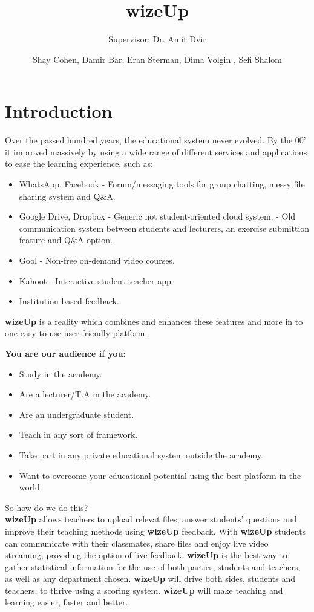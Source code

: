 \documentclass{article}
\title{wizeUp}
\author{Supervisor: Dr. Amit Dvir}
\author{Shay Cohen, Damir Bar, Eran Sterman, Dima Volgin , Sefi Shalom}
\begin{document}
\maketitle

\section{Introduction}

Over the passed hundred years, the educational system never evolved. By the 00' it improved massively by using a wide range of different services and applications to ease the learning experience, such as: 
\begin{itemize}
\item WhatsApp, Facebook - Forum/messaging tools for group chatting, messy file sharing system and Q&A.
\item Google Drive, Dropbox - Generic not student-oriented cloud system.
\itemMoodle - Old communication system between students and lecturers, an exercise submittion feature and Q&A option.
\item Gool - Non-free on-demand video courses.
\item Kahoot - Interactive student teacher app.
\item Institution based feedback.
\end{itemize}
\textbf{wizeUp}  is a reality which combines and enhances these features and more in to one easy-to-use user-friendly platform.

\textbf{You are our audience if you}:
\begin{itemize}
\item Study in the academy.
\item Are a lecturer/T.A in the academy.
\item Are an undergraduate student.
\item Teach in any sort of framework.  
\item Take part in any private educational system outside the academy.
\item Want to overcome your educational potential using the best platform in the world.
\end{itemize}
So how do we do this?\\
\textbf{wizeUp}  allows teachers to upload relevat files, answer students' questions  and improve their teaching methods using \textbf{wizeUp}  feedback. With \textbf{wizeUp}  students can communicate with their classmates, share files and enjoy live video streaming, providing the option of live feedback. \textbf{wizeUp}  is the best way to gather statistical information for the use of both parties, students and teachers, as well as any department chosen. \textbf{wizeUp}  will drive both sides, students and teachers, to thrive using a scoring system. \textbf{wizeUp}  will make teaching and learning easier, faster and better.
\end{document}
